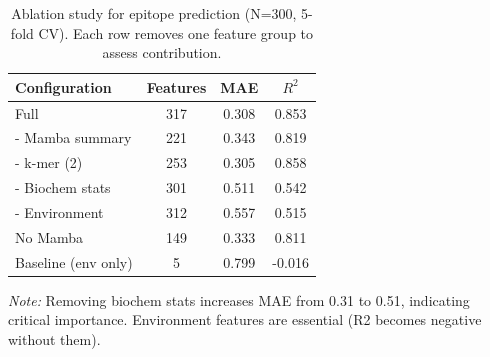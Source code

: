 \begin{table}[htbp]
\centering
\caption{Ablation study for epitope prediction (N=300, 5-fold CV). Each row removes one feature group to assess contribution.}
\label{tab:ablation}
\begin{tabular}{lccc}
\toprule
Configuration & Features & MAE & $R^2$ \\
\midrule
Full & 317 & 0.308 & 0.853 \\
- Mamba summary & 221 & 0.343 & 0.819 \\
- k-mer (2) & 253 & 0.305 & 0.858 \\
- Biochem stats & 301 & 0.511 & 0.542 \\
- Environment & 312 & 0.557 & 0.515 \\
No Mamba & 149 & 0.333 & 0.811 \\
Baseline (env only) & 5 & 0.799 & -0.016 \\
\bottomrule
\end{tabular}
\footnotesize {\textit{Note:} Removing biochem stats increases MAE from 0.31 to 0.51, indicating critical importance. Environment features are essential (R2 becomes negative without them).}
\end{table}
